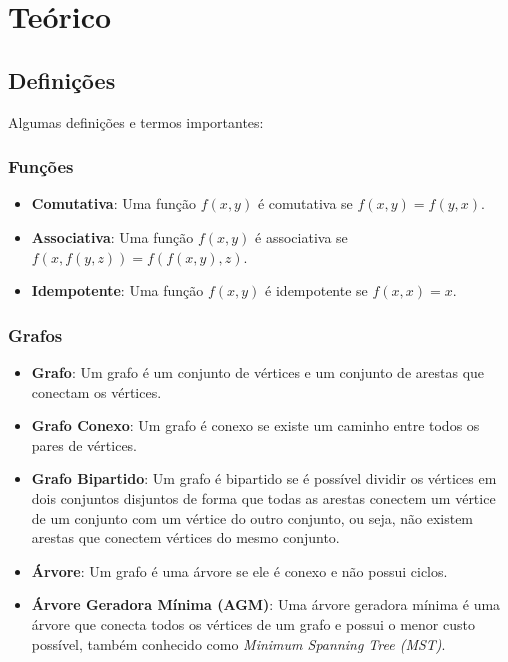 \chapter{Teórico}


\section {Definições}

Algumas definições e termos importantes:


\subsection{Funções}

\begin{itemize}
  \item \textbf{Comutativa}: Uma função $f(x, y)$ é comutativa se $f(x, y) = f(y, x)$.
  \item \textbf{Associativa}: Uma função $f(x, y)$ é associativa se $f(x, f(y, z)) = f(f(x, y), z)$.
  \item \textbf{Idempotente}: Uma função $f(x, y)$ é idempotente se $f(x, x) = x$.
\end{itemize}


\subsection{Grafos}

\begin{itemize}
  \item \textbf{Grafo}: Um grafo é um conjunto de vértices e um conjunto de arestas que conectam os vértices.
  \item \textbf{Grafo Conexo}: Um grafo é conexo se existe um caminho entre todos os pares de vértices.
  \item \textbf{Grafo Bipartido}: Um grafo é bipartido se é possível dividir os vértices em dois conjuntos disjuntos de forma que todas as arestas conectem um vértice de um conjunto com um vértice do outro conjunto, ou seja, não existem arestas que conectem vértices do mesmo conjunto.
  \item \textbf{Árvore}: Um grafo é uma árvore se ele é conexo e não possui ciclos.
  \item \textbf{Árvore Geradora Mínima (AGM)}: Uma árvore geradora mínima é uma árvore que conecta todos os vértices de um grafo e possui o menor custo possível, também conhecido como \textit{Minimum Spanning Tree (MST)}.
\end{itemize}


